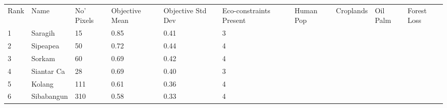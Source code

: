 \begin{table}[ht]
\centering
\begingroup\fontsize{9pt}{10pt}\selectfont
\begin{tabular}{C{0.05\textwidth}C{0.15\textwidth}C{0.08\textwidth}C{0.08\textwidth}C{0.08\textwidth}C{0.08\textwidth}C{0.08\textwidth}C{0.08\textwidth}C{0.08\textwidth}C{0.08\textwidth}}
 Rank & Name & No' Pixels & Objective Mean & Objective Std Dev & Eco-constraints  Present & Human Pop & Croplands & Oil Palm & Forest Loss \\ 
 {1} & Saragih &  15 & \textcolor[HTML]{FFFFFF}{0.85} & \textcolor[HTML]{FFFFFF}{0.41} & \textcolor[HTML]{000000}{3} &  &  &  &  \\ 
  {2} & Sipeapea &  50 & \textcolor[HTML]{FFFFFF}{0.72} & \textcolor[HTML]{FFFFFF}{0.44} & \textcolor[HTML]{FFFFFF}{4} &  &  &  &  \\ 
  {3} & Sorkam &  60 & \textcolor[HTML]{FFFFFF}{0.69} & \textcolor[HTML]{FFFFFF}{0.42} & \textcolor[HTML]{FFFFFF}{4} &  &  &  &  \\ 
  {4} & Siantar Ca &  28 & \textcolor[HTML]{000000}{0.69} & \textcolor[HTML]{FFFFFF}{0.40} & \textcolor[HTML]{000000}{3} &  &  &  &  \\ 
  {5} & Kolang & 111 & \textcolor[HTML]{000000}{0.61} & \textcolor[HTML]{000000}{0.36} & \textcolor[HTML]{FFFFFF}{4} &  &  &  &  \\ 
  {6} & Sibabangun & 310 & \textcolor[HTML]{000000}{0.58} & \textcolor[HTML]{000000}{0.33} & \textcolor[HTML]{FFFFFF}{4} &  &  &  &  \\ 

\end{tabular}
\end{table}
